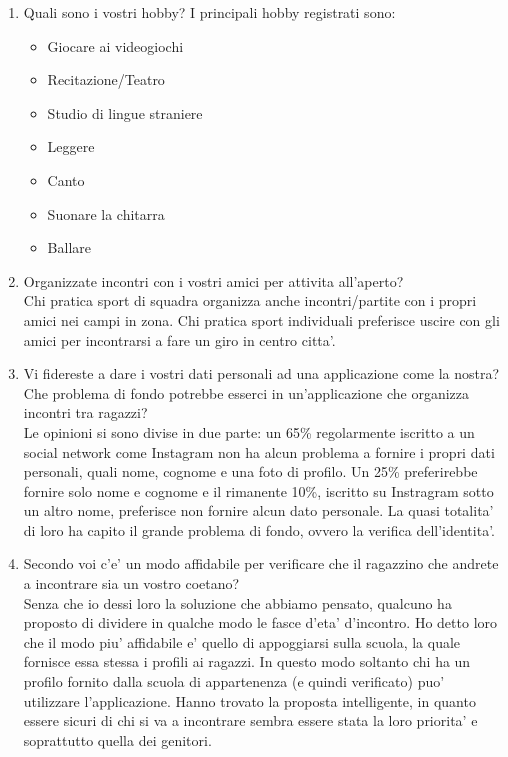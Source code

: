 \documentclass[12pt]{article}
\begin{document}
\begin{enumerate}
\begin{itemize}
  \end{itemize}
  \item Quali sono i vostri hobby?
  I principali hobby registrati sono:
  \begin{itemize}
    \item Giocare ai videogiochi
    \item Recitazione/Teatro
    \item Studio di lingue straniere
    \item Leggere
    \item Canto
    \item Suonare la chitarra
    \item Ballare
  \end{itemize}
  \item Organizzate incontri con i vostri amici per attivita all'aperto? \\
  Chi pratica sport di squadra organizza anche incontri/partite con i propri amici nei campi in zona. Chi pratica sport individuali preferisce uscire con gli amici per incontrarsi a fare un giro in centro citta'.
  \item Vi fidereste a dare i vostri dati personali ad una applicazione come la
    nostra? Che problema di fondo potrebbe esserci in un'applicazione che organizza incontri tra ragazzi? \\
    Le opinioni si sono divise in due parte: un 65\% regolarmente iscritto a un social network come Instagram non ha alcun problema a fornire i propri dati personali, quali nome, cognome e una foto di profilo. Un 25\% preferirebbe fornire solo
    nome e cognome e il rimanente 10\%, iscritto su Instragram sotto un altro nome, preferisce non fornire alcun dato personale. La quasi totalita' di loro ha capito il grande problema di fondo, ovvero la verifica dell'identita'.
  \item Secondo voi c'e' un modo affidabile per verificare che il ragazzino che andrete a incontrare sia un vostro coetano? \\
    Senza che io dessi loro la soluzione che abbiamo pensato, qualcuno ha proposto di dividere in qualche modo le fasce d'eta' d'incontro. Ho detto loro che il modo piu' affidabile e' quello di appoggiarsi sulla scuola, la quale fornisce essa
    stessa i profili ai ragazzi. In questo modo soltanto chi ha un profilo fornito dalla scuola di appartenenza (e quindi verificato) puo' utilizzare l'applicazione. Hanno trovato la proposta intelligente, in quanto essere sicuri di chi si
    va a incontrare sembra essere stata la loro priorita' e soprattutto quella dei genitori.

\end{enumerate}
\end{document}
